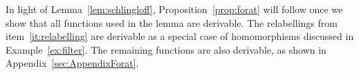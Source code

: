 In light of Lemma~\ref{lem:schlingloff},  Proposition~\ref{prop:forat} will follow once we  show that all functions  used in the lemma are derivable. The relabellings from item~\ref{it:relabelling} are derivable as  a special case of homomorphisms discussed in Example~\ref{ex:filter}.   The remaining functions are also derivable, as shown in Appendix~\ref{sec:AppendixForat}.
